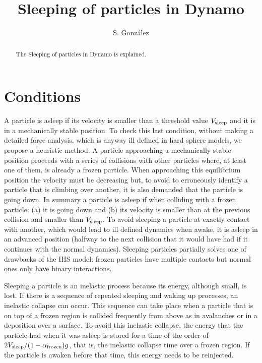\documentclass[aps,pre,onecolumn,preprint,showpacs]{revtex4}
\begin{document}
\title{Sleeping of particles in Dynamo}

\author{S. Gonz\'alez}


\begin{abstract}

  The Sleeping of particles in Dynamo is explained.

\end{abstract}
\maketitle

\section{Conditions}


A particle is asleep if its velocity is smaller than a threshold value
$V_{\rm sleep}$ and it is in a mechanically stable position. To check
this last condition, without making a detailed force analysis, which
is anyway ill defined in hard sphere models, we propose a heuristic
method. A particle approaching a mechanically stable position proceeds
with a series of collisions with other particles where, at least one
of them, is already a frozen particle. When approaching this
equilibrium position the velocity must be decreasing but, to avoid to
erroneously identify a particle that is climbing over another, it is
also demanded that the particle is going down. In summary a particle
is asleep if when colliding with a frozen particle: (a) it is going
down and (b) its velocity is smaller than at the previous collision
and smaller than $V_{\rm sleep}$. To avoid sleeping a particle at
exactly contact with another, which would lead to ill defined dynamics
when awake, it is asleep in an advanced position (halfway to the next
collision that it would have had if it continues with the normal
dynamics).  Sleeping particles partially solves one of drawbacks of
the IHS model: frozen particles have multiple contacts but normal ones
only have binary interactions.

Sleeping a particle is an inelastic process because its energy,
although small, is lost. If there is a sequence of repeated sleeping
and waking up processes, an inelastic collapse can occur. This
sequence can take place when a particle that is on top of a frozen
region is collided frequently from above as in avalanches or in a
deposition over a surface.  To avoid this inelastic collapse, the
energy that the particle had when it was asleep is stored for a time
of the order of $2V_{\rm sleep}/(1-\alpha_{\rm frozen})g$, that is,
the inelastic collapse time over a frozen region.  If the particle is
awaken before that time, this energy needs to be reinjected.
\begin{thebibliography}{}




\end{thebibliography}
\end{document}
